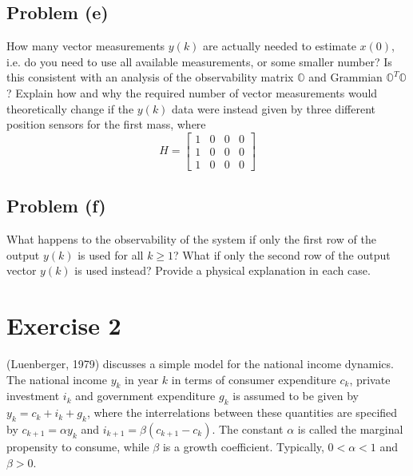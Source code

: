 \documentclass[11pt]{article}
\begin{document}
\subsection*{Problem (e)}
How many vector measurements $y(k)$ are actually needed to estimate $x(0)$, i.e. do you need to use all available measurements, or some smaller number? Is this consistent with an analysis of the observability matrix $\mathbb{O}$ and Grammian $\mathbb{O}^T\mathbb{O}$? Explain how and why the required number of vector measurements would theoretically change if the $y(k)$ data were instead given by three different position sensors for the first mass, where 
\begin{equation*}
	H=\begin{bmatrix} 1&0&0&0 \\ 1&0&0&0 \\ 1&0&0&0 \end{bmatrix}
\end{equation*}

\subparagraph*{}

\subsection*{Problem (f)}
What happens to the observability of the system if only the first row of the output $y(k)$ is used for all $k\geq 1$? What if only the second row of the output vector $y(k)$ is used instead? Provide a physical explanation in each case.

\section*{Exercise 2}
(Luenberger, 1979) discusses a simple model for the national income dynamics. The national income $y_k$ in year $k$ in terms of consumer expenditure $c_k$, private investment $i_k$ and government expenditure $g_k$ is assumed to be given by $y_k=c_k+i_k+g_k$, where the interrelations between these quantities are specified by $c_{k+1}=\alpha y_k$ and $i_{k+1}=\beta(c_{k+1}-c_k)$. The constant $\alpha$ is called the marginal propensity to consume, while $\beta$ is a growth coefficient. Typically, $0<\alpha<1$ and $\beta > 0$.
\end{document}
